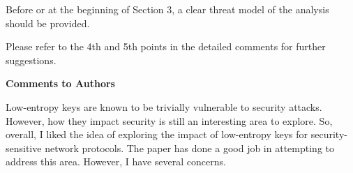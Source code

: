 \documentclass{article}
\newcommand{\response}[1]{\textcolor{red}{\{#1\}}}
\begin{document}
Before or at the beginning of Section 3, a clear threat model of the analysis should be provided.

Please refer to the 4th and 5th points in the detailed comments for further suggestions.

\rule{0pt}{8pt}

\noindent\textbf{Comments to Authors}

Low-entropy keys are known to be trivially vulnerable to security attacks. 
However, how they impact security is still an interesting area to explore. 
So, overall, I liked the idea of exploring the impact of low-entropy keys for security-sensitive network protocols. 
The paper has done a good job in attempting to address this area. 
However, I have several concerns.
\end{document}
